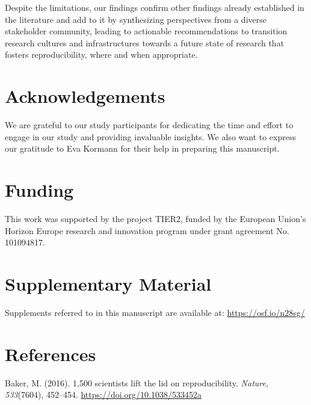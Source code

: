 \documentclass[authordate, meta]{jote-new-article}
\begin{document}
	Despite the limitations, our findings confirm other findings already established in the literature and add to it by synthesizing perspectives from a diverse stakeholder community, leading to actionable recommendations to transition research cultures and infrastructures towards a future state of research that fosters reproducibility, where and when appropriate.







	\section{Acknowledgements}



	We are grateful to our study participants for dedicating the time and effort to engage in our study and providing invaluable insights. We also want to express our gratitude to Eva Kormann for their help in preparing this manuscript.



	\section{Funding}



	This work was supported by the project TIER2, funded by the European Union's Horizon Europe research and innovation program under grant agreement No. 101094817.







	\section{Supplementary Material}



	Supplements referred to in this manuscript are available at: \url{https://osf.io/n28sg/}



	\section{References}



	Baker, M. (2016). 1,500 scientists lift the lid on reproducibility. \emph{Nature}, \emph{533}(7604), 452--454. \url{https://doi.org/10.1038/533452a}
\end{document}

